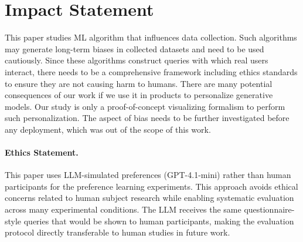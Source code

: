 \documentclass{article}
\begin{document}



\FloatBarrier
\newpage
\section*{Impact Statement}
This paper studies ML algorithm that influences data collection. Such algorithms may generate long-term biases in collected datasets and need to be used cautiously. Since these algorithms construct queries with which real users interact, there needs to be a comprehensive framework including ethics standards to ensure they are not causing harm to humans. There are many potential consequences of our work if we use it in products to personalize generative models. Our study is only a proof-of-concept visualizing formalism to perform such personalization. The aspect of bias needs to be further investigated before any deployment, which was out of the scope of this work.

\paragraph{Ethics Statement.}
This paper uses LLM-simulated preferences (GPT-4.1-mini) rather than human participants for the preference learning experiments. This approach avoids ethical concerns related to human subject research while enabling systematic evaluation across many experimental conditions. The LLM receives the same questionnaire-style queries that would be shown to human participants, making the evaluation protocol directly transferable to human studies in future work.
\end{document}
